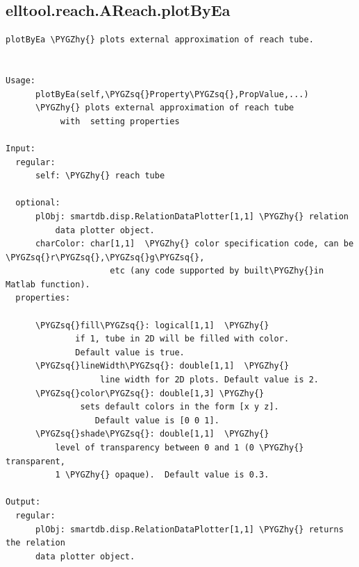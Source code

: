 \documentclass[letterpaper,10pt,english]{sphinxmanual}
\def\PYGZhy{\char`\-}
\def\PYGZsq{\char`\'}
\begin{document}
\subsection{elltool.reach.AReach.plotByEa}
\label{chap_functions:elltool-reach-areach-plotbyea}
\begin{Verbatim}[commandchars=\\\{\}]
plotByEa \PYGZhy{} plots external approximation of reach tube.


Usage:
      plotByEa(self,\PYGZsq{}Property\PYGZsq{},PropValue,...)
      \PYGZhy{} plots external approximation of reach tube
           with  setting properties

Input:
  regular:
      self: \PYGZhy{} reach tube

  optional:
      plObj: smartdb.disp.RelationDataPlotter[1,1] \PYGZhy{} relation
          data plotter object.
      charColor: char[1,1]  \PYGZhy{} color specification code, can be \PYGZsq{}r\PYGZsq{},\PYGZsq{}g\PYGZsq{},
                     etc (any code supported by built\PYGZhy{}in Matlab function).
  properties:

      \PYGZsq{}fill\PYGZsq{}: logical[1,1]  \PYGZhy{}
              if 1, tube in 2D will be filled with color.
              Default value is true.
      \PYGZsq{}lineWidth\PYGZsq{}: double[1,1]  \PYGZhy{}
                   line width for 2D plots. Default value is 2.
      \PYGZsq{}color\PYGZsq{}: double[1,3] \PYGZhy{}
               sets default colors in the form [x y z].
                  Default value is [0 0 1].
      \PYGZsq{}shade\PYGZsq{}: double[1,1]  \PYGZhy{}
          level of transparency between 0 and 1 (0 \PYGZhy{} transparent,
          1 \PYGZhy{} opaque).  Default value is 0.3.

Output:
  regular:
      plObj: smartdb.disp.RelationDataPlotter[1,1] \PYGZhy{} returns the relation
      data plotter object.
\end{Verbatim}
\end{document}
